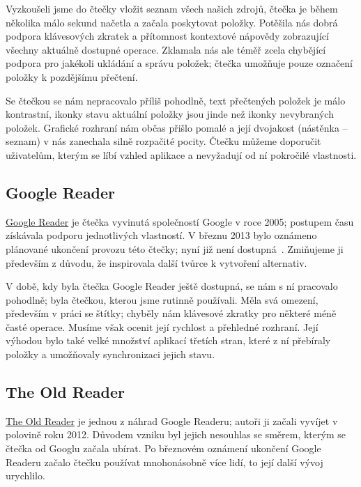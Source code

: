 Vyzkoušeli jsme do čtečky vložit seznam všech našich zdrojů, čtečka je během několika málo sekund načetla a začala poskytovat položky.
Potěšila nás dobrá podpora klávesových zkratek a přítomnost kontextové nápovědy zobrazující všechny aktuálně dostupné operace.
Zklamala nás ale téměř zcela chybějící podpora pro jakékoli ukládání a správu položek; čtečka umožňuje pouze označení položky k pozdějšímu přečtení.

Se čtečkou se nám nepracovalo příliš pohodlně, text přečtených položek je málo kontrastní, ikonky stavu aktuální položky jsou jinde než ikonky nevybraných položek.
Grafické rozhraní nám občas přišlo pomalé a její dvojakost (nástěnka -- seznam) v nás zanechala silně rozpačité pocity.
Čtečku můžeme doporučit uživatelům, kterým se líbí vzhled aplikace a nevyžadují od ní pokročilé vlastnosti.

\subsection{Google Reader}

\href{http://www.google.com/reader/about/}{Google Reader} je čtečka vyvinutá společností Google v roce 2005; postupem času získávala podporu jednotlivých vlastností.
V březnu 2013 bylo oznámeno plánované ukončení provozu této čtečky; nyní již není dostupná~\cite{google-reader-down}.
Zmiňujeme ji především z důvodu, že inspirovala další tvůrce k vytvoření alternativ.

V době, kdy byla čtečka Google Reader ještě dostupná, se nám s ní pracovalo pohodlně; byla čtečkou, kterou jsme rutinně používali.
Měla svá omezení, především v práci se štítky; chyběly nám klávesové zkratky pro některé méně časté operace.
Musíme však ocenit její rychlost a přehledné rozhraní.
Její výhodou bylo také velké množství aplikací třetích stran, které z ní přebíraly položky a umožňovaly synchronizaci jejich stavu.

\subsection{The Old Reader}

\href{http://theoldreader.com/}{The Old Reader} je jednou z náhrad Google Readeru; autoři ji začali vyvíjet v polovině roku 2012.
Důvodem vzniku byl jejich nesouhlas se směrem, kterým se čtečka od Googlu začala ubírat.
Po březnovém oznámení ukončení Google Readeru začalo čtečku používat mnohonásobně více lidí, to její další vývoj urychlilo.

